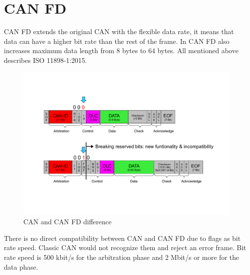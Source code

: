 \documentclass{ctuthesis}
\begin{document}
 \section{CAN FD}
  CAN FD extends the original CAN with the flexible data rate, it means that data can have a higher bit rate than the rest of the frame. In CAN FD also increases maximum data length from 8 bytes to 64 bytes. All mentioned above describes ISO 11898-1:2015.
  \begin{figure}[H]
  \includegraphics[width=1\textwidth]{agl2017-socketcan-can_fd}
  \caption{CAN and CAN FD difference \cite{canfd}}
  \end{figure}
  There is no direct compatibility between CAN and CAN FD due to flags as bit rate speed. Classic CAN would not recognize them and reject an error frame. Bit rate speed is 500 kbit/s for the arbitration phase and 2 Mbit/s or more for the data phase.
 
\end{document}
